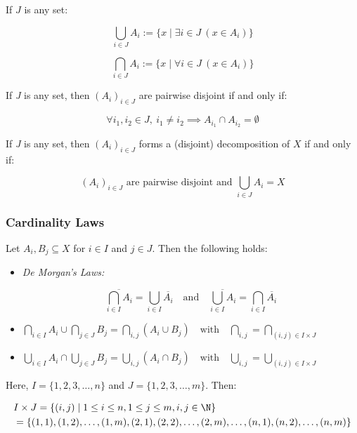 If \( J \) is any set:

\[
	\bigcup_{i \in J} A_i := \{ x \mid \exists i \in J \ (x \in A_i) \}
\]

\[
	\bigcap_{i \in J} A_i := \{ x \mid \forall i \in J \ (x \in A_i) \}
\]

If \emph{J} is any set, then \( {(A_i)}_{i \in J} \) are pairwise disjoint if and only if:

\[
	\forall i_1, i_2 \in J, \ i_1 \neq i_2 \implies A_{i_1} \cap A_{i_2} = \emptyset
\]

If \emph{J} is any set, then \( {(A_i)}_{i \in J} \) forms a (disjoint) decomposition of \(X\) if 
and only if:

\[
	{(A_i)}_{i \in J} \text{ are pairwise disjoint and } \bigcup_{i \in J} A_i = X
\]

\subsubsection{Cardinality Laws}

Let \( A_i, B_j \subseteq X \) for \( i \in I \) and \( j \in J \). Then the following holds:

\begin{itemize}

	\item\emph{De Morgan's Laws:}

	\[
		\overline{\bigcap_{i \in I} A_i}= \bigcup_{i \in I} \overline{A_i} \quad \text{and} \quad 
		\overline{\bigcup_{i \in I} A_i} = \bigcap_{i \in I} \overline{A_i}
	\]

	\item\(
		\bigcap_{i \in I} A_i \cup \bigcap_{j \in J} B_j = \bigcap_{i,j} (A_i \cup B_j) \quad \text{with} 
		\quad \bigcap_{i,j} = \bigcap_{(i,j) \in I \times J}
	\)

	\item\(
		\bigcup_{i \in I} A_i \cap \bigcup_{j \in J} B_j = \bigcup_{i,j} (A_i \cap B_j) \quad \text{with} 
		\quad \bigcup_{i,j} = \bigcup_{(i,j) \in I \times J}
	\)

\end{itemize}

Here, \( I = \{ 1, 2, 3, \dots, n \} \) and \( J = \{ 1, 2, 3, \dots, m \} \). Then:

\begin{align*}
&I \times J = \{ (i, j) \mid 1 \leq i \leq n, 1 \leq j \leq m, i, j \in \N \} \\
&= \{ (1, 1), (1, 2), \dots, (1, m), (2, 1), (2, 2), \dots, (2, m), \dots, (n, 1), (n, 2), \dots, (n, m) \}
\end{align*}


